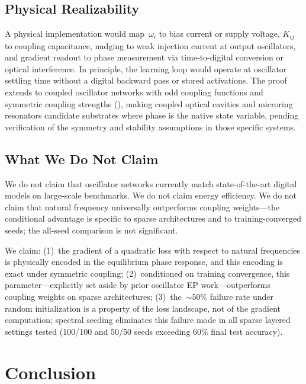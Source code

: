 \documentclass[11pt,a4paper]{article}
\begin{document}
\subsection{Physical Realizability}

A physical implementation would map~$\omega_i$ to bias current or supply
voltage, $K_{ij}$ to coupling capacitance, nudging to weak injection
current at output oscillators, and gradient readout to phase measurement
via time-to-digital conversion or optical interference. In principle,
the learning loop would operate at oscillator settling time without a
digital backward pass or stored activations. The proof extends to
coupled oscillator networks with odd coupling functions and symmetric
coupling strengths (), making coupled
optical cavities and microring resonators candidate substrates where
phase is the native state variable, pending verification of the
symmetry and stability assumptions in those specific systems.

\subsection{What We Do Not Claim}

We do not claim that oscillator networks currently match state-of-the-art
digital models on large-scale benchmarks. We do not claim energy efficiency. We do not claim that
natural frequency universally outperforms coupling weights---the
conditional advantage is specific to sparse architectures and to
training-converged seeds; the all-seed comparison is not significant.

We claim: (1)~the gradient of a quadratic loss with respect to natural
frequencies is physically encoded in the equilibrium phase response, and
this encoding is exact under symmetric coupling; (2)~conditioned on
training convergence, this parameter---explicitly set aside by prior oscillator
EP work---outperforms coupling weights on sparse architectures;
(3)~the~$\sim$50\% failure rate under random initialization is a
property of the loss landscape, not of the gradient computation;
spectral seeding eliminates this failure mode in all sparse layered
settings tested (100/100 and 50/50 seeds exceeding 60\% final test
accuracy).

\section{Conclusion}
\label{sec:conclusion}
\end{document}

